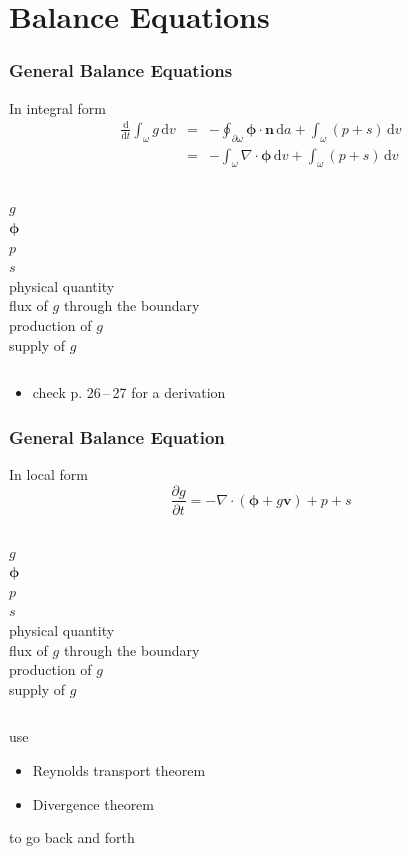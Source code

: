 \documentclass[hide notes,intlimits]{beamer}
\begin{document}
\section{Balance Equations}

\begin{frame}
  \frametitle{General Balance Equations}
  \begin{block}{In integral form}
    \begin{eqnarray}
      \frac{\text{d} }{\text{d} t} \int_{\omega} g \, \text{d} v & = & - \oint_{\partial \omega} \boldsymbol{\phi} \cdot \mathbf{n} \, \text{d} a +  \int_{\omega} \left(p + s\right) \, \text{d} v \\
      & = & - \int_{\omega} \nabla \cdot \boldsymbol{\phi} \, \text{d} v +  \int_{\omega} \left(p + s\right) \, \text{d} v
    \end{eqnarray}
    \begin{columns}
      \column[C]{0.1cm}
      $g$ \\
      $\boldsymbol{\phi}$ \\
      $p$ \\
      $s$ \\
      \column[C]{6cm}
      physical quantity \\
      flux of $g$ through the boundary \\
      production of $g$ \\
      supply of $g$
    \end{columns}
    \begin{itemize}
      \item check p. 26\,--\,27 for a derivation
      \end{itemize}
  \end{block}

\end{frame}

\begin{frame}
  \frametitle{General Balance Equation}
  \begin{block}{In local form}
    \begin{equation}
      \frac{\partial g}{\partial t} = - \nabla \cdot \left(\boldsymbol{\phi} + g\mathbf{v}\right) + p + s
    \end{equation}
    \begin{columns}
      \column[C]{0.1cm}
      $g$ \\
      $\boldsymbol{\phi}$ \\
      $p$ \\
      $s$ \\
      \column[C]{6cm}
      physical quantity \\
      flux of $g$ through the boundary \\
      production of $g$ \\
      supply of $g$
    \end{columns}
  \end{block}
  use
  \begin{itemize}
    \item Reynolds transport theorem
    \item Divergence theorem
    \end{itemize}
    to go back and forth
\end{frame}
\end{document}
